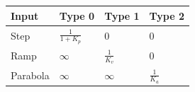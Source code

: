 \documentclass[12pt,a4paper]{article}
\renewcommand{\arraystretch}{1.45}
\begin{document}
\begin{tcolorbox}[tikzbox, title={\textbf{SSE Quick Reference Table}}]
{\renewcommand{\arraystretch}{1.9}%
\begin{tabularx}{\linewidth}{|>{\centering\arraybackslash}X|>{\centering\arraybackslash}X|>{\centering\arraybackslash}X|>{\centering\arraybackslash}X|}
\hline
\textbf{\color{myteal}Input} & \textbf{\color{myteal}Type 0} & \textbf{\color{myteal}Type 1} & \textbf{\color{myteal}Type 2} \\
\hline
Step     & $\displaystyle\frac{1}{1+K_p}$ & $0$              & $0$ \\[6pt]
\hline
Ramp     & $\infty$           & $\displaystyle\frac{1}{K_v}$ & $0$ \\[6pt]
\hline
Parabola & $\infty$           & $\infty$         & $\displaystyle\frac{1}{K_a}$ \\[6pt]
\hline
\end{tabularx}}
\end{tcolorbox}
\end{document}
